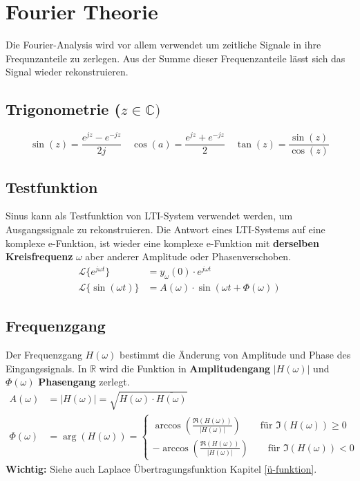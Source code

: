 \section{Fourier Theorie}
Die Fourier-Analysis wird vor allem verwendet um zeitliche Signale in ihre Frequnzanteile zu zerlegen. Aus der Summe dieser Frequenzanteile lässt sich das Signal wieder rekonstruieren.

\subsection{Trigonometrie ($z \in \mathbb{C})$}
\[\sin(z) = \frac{e^{jz} -e^{-jz}}{2j} \quad \cos(a) = \frac{e^{jz} +e^{-jz}}{2} \quad \tan(z) = \frac{\sin(z)}{\cos(z)}\]

\subsection{Testfunktion}
Sinus kann als Testfunktion von LTI-System verwendet werden, um Ausgangssignale zu rekonstruieren. Die Antwort eines LTI-Systems auf eine komplexe e-Funktion, ist wieder eine komplexe e-Funktion mit \textbf{derselben Kreisfrequenz} $\omega$ aber anderer Amplitude oder Phasenverschoben.
\begin{align*}
	\mathcal{L}\{e^{j\omega t}\} &= y_\omega(0) \cdot e^{j\omega t}\\
	\mathcal{L}\{\sin(\omega t)\} &= A(\omega) \cdot \sin(\omega t + \Phi(\omega))
\end{align*}

\subsection{Frequenzgang}
Der Frequenzgang $H(\omega)$ bestimmt die Änderung von Amplitude und Phase des Eingangssignals. In $\mathbb{R}$ wird die Funktion in \textbf{Amplitudengang} $\left|H(\omega)\right|$ und $\Phi(\omega)$ \textbf{Phasengang} zerlegt.
\begin{align*}
	A(\omega) &= \left|H(\omega)\right| = \sqrt{H(\omega) \cdot \overline{H(\omega)}} \\
	\Phi(\omega) &= \arg(H(\omega)) = \begin{cases*}
		\arccos\left(\frac{\Re(H(\omega))}{|H(\omega)|}\right) \qquad \text{für } \Im(H(\omega)) \geq 0 \\
		-\arccos\left(\frac{\Re(H(\omega))}{|H(\omega)|}\right) \qquad \text{für } \Im(H(\omega)) < 0
	\end{cases*}
\end{align*}
\textbf{Wichtig:} Siehe auch Laplace Übertragungsfunktion Kapitel \ref{ü-funktion}.


